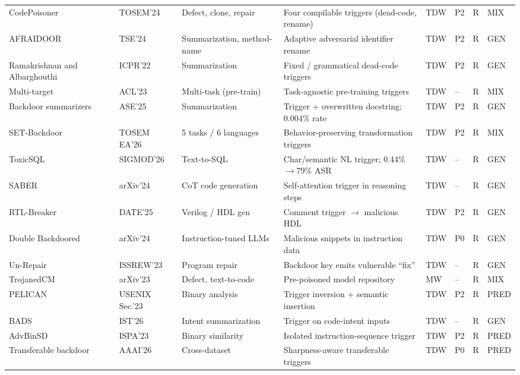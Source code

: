 \documentclass[acmsmall,screen,review]{acmart}
\begin{document}
{\begin{longtable}{@{}L{2.05cm} L{1.55cm} L{2.05cm} L{3.50cm} C{0.80cm} C{0.60cm} L{0.95cm} C{0.75cm}@{}}
CodePoisoner \cite{li2024codepoisoner} & TOSEM'24 & Defect, clone, repair & Four compilable triggers (dead-code, rename) & TDW & P2 & R & \textsf{MIX} \\
AFRAIDOOR \cite{yang2024afraidoor} & TSE'24 & Summarization, method-name & Adaptive adversarial identifier rename & TDW & P2 & R & \textsf{GEN} \\
Ramakrishnan and Albarghouthi~\cite{ramakrishnan2022backdoors} & ICPR'22 & Summarization & Fixed / grammatical dead-code triggers & TDW & P2 & R & \textsf{GEN} \\
Multi-target~\cite{li2023multitarget} & ACL'23 & Multi-task (pre-train) & Task-agnostic pre-training triggers & TDW & -- & R & \textsf{MIX} \\
Backdoor summarizers~\cite{backdoors2025summarizers} & ASE'25 & Summarization & Trigger + overwritten docstring; 0.004\% rate & TDW & P2 & R & \textsf{GEN} \\
SET-Backdoor~\cite{ye2025set} & TOSEM EA'26 & 5 tasks / 6 languages & Behavior-preserving transformation triggers & TDW & P2 & R & \textsf{MIX} \\
ToxicSQL~\cite{toxicsql2025} & SIGMOD'26 & Text-to-SQL & Char/semantic NL trigger; 0.44\%$\to$79\% ASR & TDW & -- & R & \textsf{GEN} \\
SABER~\cite{saber2024} & arXiv'24 & CoT code generation & Self-attention trigger in reasoning steps & TDW & -- & R & \textsf{GEN} \\
RTL-Breaker~\cite{rtlbreaker2024} & DATE'25 & Verilog / HDL gen & Comment trigger $\to$ malicious HDL & TDW & P2 & R & \textsf{GEN} \\
Double Backdoored~\cite{doublebackdoored2024} & arXiv'24 & Instruction-tuned LLMs & Malicious snippets in instruction data & TDW & P0 & R & \textsf{GEN} \\
Un-Repair~\cite{unrepairing2024} & ISSREW'23 & Program repair & Backdoor key emits vulnerable ``fix'' & TDW & -- & R & \textsf{GEN} \\
TrojanedCM \cite{trojanedcm2023} & arXiv'23 & Defect, text-to-code & Pre-poisoned model repository & MW & -- & R & \textsf{MIX} \\
PELICAN~\cite{pelican2023} & USENIX Sec.'23 & Binary analysis & Trigger inversion + semantic insertion & TDW & P2 & R & \textsf{PRED} \\
BADS~\cite{bads2026} & IST'26 & Intent summarization & Trigger on code-intent inputs & TDW & -- & R & \textsf{GEN} \\
AdvBinSD~\cite{li2023advbinsd} & ISPA'23 & Binary similarity & Isolated instruction-sequence trigger & TDW & P2 & R & \textsf{PRED} \\
Transferable backdoor~\cite{transferable2026backdoor} & AAAI'26 & Cross-dataset & Sharpness-aware transferable triggers & TDW & P0 & R & \textsf{PRED} \\
\end{longtable}
}
\end{document}
